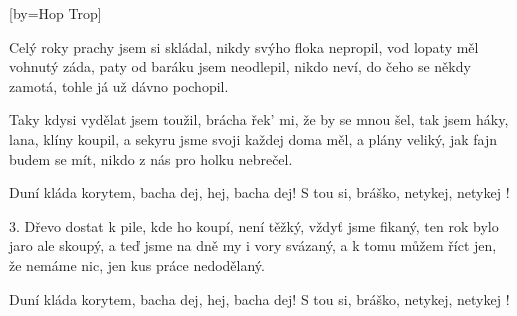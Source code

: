 [by={Hop Trop}]

\beginverse{}
Celý roky prachy jsem si skládal,
nikdy svýho floka nepropil,
vod lopaty měl vohnutý záda,
paty od baráku jsem neodlepil,
nikdo neví, do čeho se někdy zamotá,
tohle já už dávno pochopil.
\endverse{}

\beginverse{}
Taky kdysi vydělat jsem toužil,
brácha řek' mi, že by se mnou šel,
tak jsem háky, lana, klíny koupil,
a sekyru jsme svoji každej doma měl,
a plány veliký, jak fajn budem se mít,
nikdo z nás pro holku nebrečel.
\endverse{}

\beginchorus{}
Duní kláda korytem, bacha dej, hej, bacha dej!
S tou si, bráško, netykej, netykej !
\endchorus{}

\beginverse{}
3. Dřevo dostat k pile, kde ho koupí,
není těžký, vždyť jsme fikaný,
ten rok bylo jaro ale skoupý,
a teď jsme na dně my i vory svázaný,
a k tomu můžem říct jen, že nemáme nic,
jen kus práce nedodělaný.
\endverse{}

\beginchorus{}
\lrep{} Duní kláda korytem, bacha dej, hej, bacha dej!
S tou si, bráško, netykej, netykej ! \rrep{}
\endchorus{}

\endsong{}
